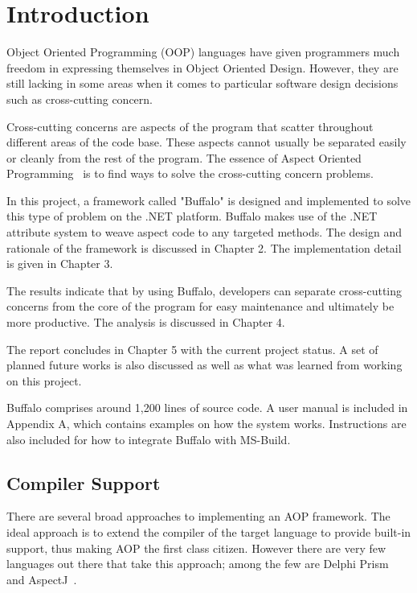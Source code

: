 \chapter{Introduction}

Object Oriented Programming (OOP) languages have given programmers much freedom in expressing themselves in Object Oriented Design. However, they are still lacking in some areas when it comes to particular software design decisions such as cross-cutting concern.

Cross-cutting concerns are aspects of the program that scatter throughout different areas of the code base. These aspects cannot usually be separated easily or cleanly from the rest of the program. The essence of Aspect Oriented Programming~\cite{aop} is to find ways to solve the cross-cutting concern problems.

In this project, a framework called "Buffalo" is designed and implemented to solve this type of problem on the .NET platform. Buffalo makes use of the .NET attribute system to weave aspect code to any targeted methods. The design and rationale of the framework is discussed in Chapter 2. The implementation detail is given in Chapter 3.

The results indicate that by using Buffalo, developers can separate cross-cutting concerns from the core of the program for easy maintenance and ultimately be more productive. The analysis is discussed in Chapter 4.

The report concludes in Chapter 5 with the current project status. A set of planned future works is also discussed as well as what was learned from working on this project.

Buffalo comprises around 1,200 lines of source code. A user manual is included in Appendix A, which contains examples on how the system works. Instructions are also included for how to integrate Buffalo with MS-Build.


\section{Compiler Support}

There are several broad approaches to implementing an AOP framework. The ideal approach is to extend the compiler of the target language to provide built-in support, thus making AOP the first class citizen. However there are very few languages out there that take this approach; among the few are Delphi Prism~\cite{delphi_prism2010} and AspectJ~\cite{aspectj_faq, aspectj_text}. 

